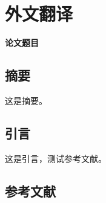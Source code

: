 \cleardoublepage
\section{外文翻译}
\renewcommand{\theequation}{\arabic{equation}}
\renewcommand{\thefigure}{\arabic{figure}}
\begin{center}
    \textbf{论文题目}
\end{center}
\subsection*{摘要}
这是摘要。



\subsection{引言}
这是引言，测试参考文献\cite{schweizer2013comparative}。

\newpage

\subsection{参考文献}
{\normalfont{}\setlength{\baselineskip}{14pt}
\renewcommand{\refname}{\vspace{-\baselineskip}}
}

\resettocdepth %
